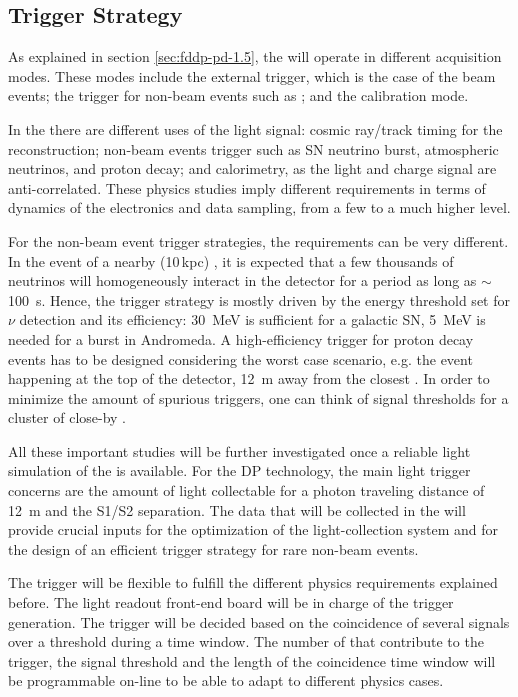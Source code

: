 \subsection{Trigger Strategy}
\label{sec:fddp-pd-7.2}

As explained in section \ref{sec:fddp-pd-1.5}, the  will operate in different acquisition modes. These modes include the external trigger, which is the case of the beam events; the trigger for non-beam events such as  ; and the calibration mode. 

In the \lartpc there are different uses of the light signal: cosmic ray/track timing for the reconstruction; non-beam events trigger such as SN neutrino burst, atmospheric neutrinos, and proton decay; and calorimetry, as the light and charge signal are anti-correlated. These physics studies imply different requirements in terms of dynamics of the electronics and data sampling, from a few \phel to a much higher level.

For the non-beam event trigger strategies, the requirements can be very different. In the event of a nearby (10\,kpc)  , it is expected that a few thousands of neutrinos will homogeneously interact in the detector for a period as long as $\sim$\SI{100}{s}. Hence, the   trigger strategy is mostly driven by the energy threshold set for $\nu$ detection and its efficiency: \SI{30}{MeV} is sufficient for a galactic SN, \SI{5}{MeV} is needed for a burst in Andromeda. A high-efficiency trigger for proton decay events has to be designed considering the worst case scenario, e.g. the event happening at the top of the detector, \SI{12}{m} away from the closest . In order to minimize the amount of spurious triggers, one can think of signal thresholds for a cluster of close-by .

All these important studies will be further investigated once a reliable light simulation of the  is available. For the DP technology, the main light trigger concerns are the amount of light collectable for a photon traveling distance of \SI{12}{m} and the S1/S2 separation. The data that will be collected in the  will provide crucial inputs for the optimization of the  light-collection system and for the design of an efficient trigger strategy for rare non-beam events. 

The  trigger will be flexible to fulfill the different physics requirements explained before. The light readout front-end board will be in charge of the  trigger generation. The trigger will be decided based on the coincidence of several  signals over a threshold during a time window. The number of  that contribute to the trigger, the signal threshold and the length of the coincidence time window will be programmable on-line to be able to adapt to different physics cases.


